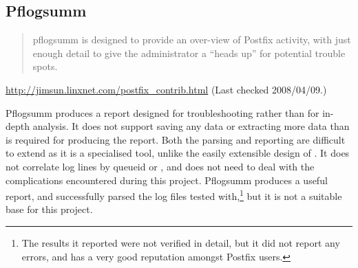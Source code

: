%

\subsection{Pflogsumm}

\begin{quotation}

    pflogsumm is designed to provide an over-view of Postfix activity, with
    just enough detail to give the administrator a ``heads up'' for
    potential trouble spots.

\end{quotation}

\noindent{}\url{http://jimsun.linxnet.com/postfix_contrib.html} \newline{}
(Last checked 2008/04/09.)

Pflogsumm produces a report designed for troubleshooting rather than for
in-depth analysis.  It does not support saving any data or extracting more
data than is required for producing the report.  Both the parsing and
reporting are difficult to extend as it is a specialised tool, unlike the
easily extensible design of \parsername{}.  It does not correlate log lines
by queueid or \pid{}, and does not need to deal with the complications
encountered during this project.  Pflogsumm produces a useful report, and
successfully parsed the \numberOFlogFILES{} log files tested
with,\footnote{The results it reported were not verified in detail, but it
did not report any errors, and has a very good reputation amongst Postfix
users.} but it is not a suitable base for this project.

